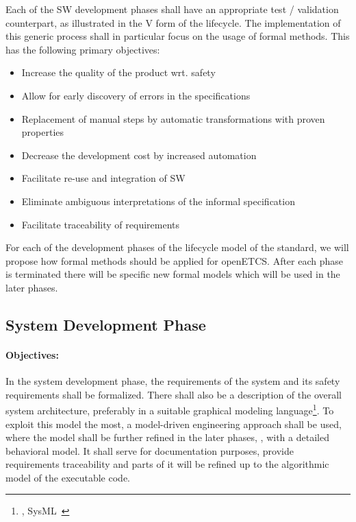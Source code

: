 Each of the SW development phases shall have an appropriate test / validation
counterpart, as illustrated in the V form of the lifecycle. The implementation
of this generic process shall in particular focus on the usage of formal
methods. This has the following primary objectives:

\begin{itemize}
\item Increase the quality of the product wrt. safety
\item Allow for early discovery of errors in the  specifications
\item Replacement of manual steps by automatic transformations with proven
  properties
\item Decrease the development cost by increased automation
\item Facilitate re-use and integration of SW
\item Eliminate ambiguous interpretations of the informal specification
\item Facilitate traceability of requirements
\end{itemize}

For each of the development phases of the lifecycle model of the standard, we
will propose how formal methods should be applied for openETCS. After each phase
is terminated there will be specific new formal models which will be used in the
later phases.

\subsection{System Development Phase}
\label{sec:syst-devel-phase}

\paragraph{Objectives:}
\label{sec:sys-dev-objective}
In the system development phase, the requirements of the system and its safety
requirements shall be formalized. There shall also be a description of the
overall system architecture, preferably in a suitable graphical modeling
language\footnote{\eg, SysML~\cite{SysMLSpec}}. To exploit this model the most,
a model-driven engineering approach shall be used, where the model shall be
further refined in the later phases, \eg, with a detailed behavioral model. It
shall serve for documentation purposes, provide requirements traceability and
parts of it will be refined up to the algorithmic model of the executable code.

